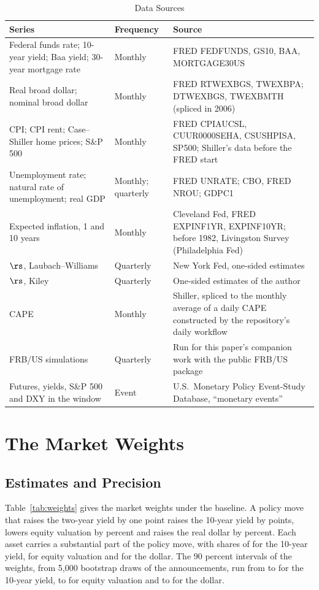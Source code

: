 \begin{appendices}
\begin{table}[tbp]\centering\small
\caption{Data Sources}\label{tab:data}
\begin{tabular}{p{}p{}p{}}\toprule
Series & Frequency & Source \\\midrule
Federal funds rate; 10-year yield; Baa yield; 30-year mortgage rate & Monthly & FRED FEDFUNDS, GS10, BAA, MORTGAGE30US \\
Real broad dollar; nominal broad dollar & Monthly & FRED RTWEXBGS, TWEXBPA; DTWEXBGS, TWEXBMTH (spliced in 2006) \\
CPI; CPI rent; Case--Shiller home prices; S\&P 500 & Monthly & FRED CPIAUCSL, CUUR0000SEHA, CSUSHPISA, SP500; Shiller's data before the FRED start \\
Unemployment rate; natural rate of unemployment; real GDP & Monthly; quarterly & FRED UNRATE; CBO, FRED NROU; GDPC1 \\
Expected inflation, 1 and 10 years & Monthly & Cleveland Fed, FRED EXPINF1YR, EXPINF10YR; before 1982, Livingston Survey (Philadelphia Fed) \\
$\rs$, Laubach--Williams & Quarterly & New York Fed, one-sided estimates \\
$\rs$, Kiley & Quarterly & One-sided estimates of the author \\
CAPE & Monthly & Shiller, spliced to the monthly average of a daily CAPE constructed by the repository's daily workflow \\
FRB/US simulations & Quarterly & Run for this paper's companion work with the public FRB/US package \\
Futures, yields, S\&P 500 and DXY in the window & Event & U.S.\ Monetary Policy Event-Study Database, ``monetary events'' \citep{acosta2025} \\
\bottomrule
\end{tabular}
\end{table}

\section{The Market Weights}\label{app:weights}
\subsection{Estimates and Precision}\label{sec:precision}
Table~\ref{tab:weights} gives the market weights under the baseline. A policy move that raises the two-year yield by one point raises the 10-year yield by  points, lowers equity valuation by  percent and raises the real dollar by  percent. Each asset carries a substantial part of the policy move, with shares of  for the 10-year yield,  for equity valuation and  for the dollar. The 90 percent intervals of the weights, from 5,000 bootstrap draws of the  announcements, run from  to  for the 10-year yield,  to  for equity valuation and  to  for the dollar.


\end{appendices}
